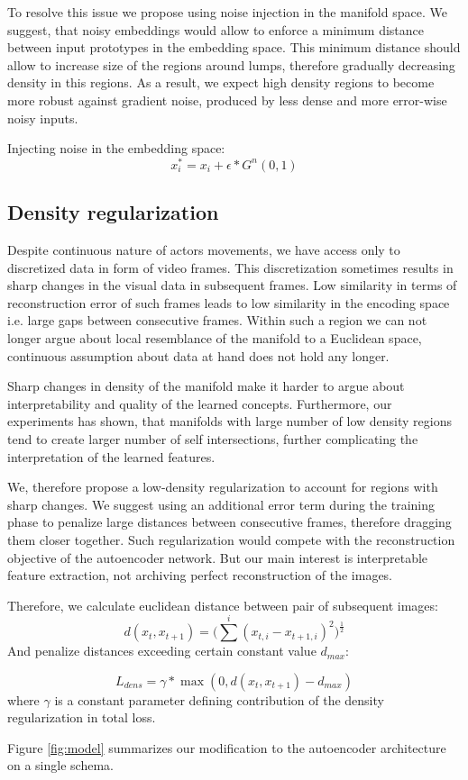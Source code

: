 To resolve this issue we propose using noise injection in the manifold space.
We suggest, that noisy embeddings would allow to enforce a minimum distance between input prototypes in the embedding space.
This minimum distance should allow to increase size of the regions around lumps, therefore gradually decreasing density in this regions.
As a result, we expect high density regions to become more robust against gradient noise, produced by less dense and more error-wise noisy inputs.

Injecting noise in the embedding space:
\begin{equation}
  x_i^* = x_i + \epsilon*G^n(0, 1)
\end{equation}

\subsection{Density regularization}

Despite continuous nature of actors movements, we have access only to discretized data in form of video frames.
This discretization sometimes results in sharp changes in the visual data in subsequent frames.
Low similarity in terms of reconstruction error of such frames leads to low similarity in the encoding space i.e. large gaps between consecutive frames.
Within such a region we can not longer argue about local resemblance of the manifold to a Euclidean space, continuous assumption about data at hand does not hold any longer.

Sharp changes in density of the manifold make it harder to argue about interpretability and quality of the learned concepts.
Furthermore, our experiments has shown, that manifolds with large number of low density regions tend to create larger number of self intersections, further complicating the interpretation of the learned features.

We, therefore propose a low-density regularization to account for regions with sharp changes.
We suggest using an additional error term during the training phase to penalize large distances between consecutive frames, therefore dragging them closer together.
Such regularization would compete with the reconstruction objective of the autoencoder network.
But our main interest is interpretable feature extraction, not archiving perfect reconstruction of the images.

Therefore, we calculate euclidean distance between pair of subsequent images:
\begin{equation*}
d(x_t, x_{t+1}) = \Big(\sum^i { (x_{t,i}-x_{t+1, i})^2}\Big)^{\frac{1}{2}}
\end{equation*}
And penalize distances exceeding certain constant value $d_{max}$:

\begin{equation*}
  L_{dens} = \gamma*\max(0, d(x_t, x_{t+1})-d_{max})
\end{equation*}
where $\gamma$ is a constant parameter defining contribution of the density regularization in total loss.


Figure \ref{fig:model} summarizes our modification to the autoencoder architecture on a single schema.


